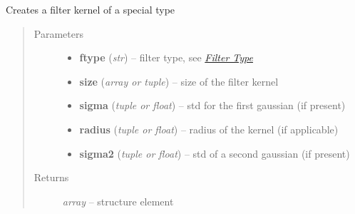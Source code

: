 \documentclass[letterpaper,10pt,english]{sphinxmanual}
\begin{document}
\begin{fulllineitems}
\label{api/ClearMap.ImageProcessing.Filter:ClearMap.ImageProcessing.Filter.FilterKernel.filterKernel}
Creates a filter kernel of a special type
\begin{quote}\begin{description}
\item[{Parameters}] \leavevmode\begin{itemize}
\item {} 
\textbf{ftype} (\emph{str}) --
filter type, see {\hyperref[api/ClearMap.ImageProcessing.Filter:filtertypes]{\emph{Filter Type}}}

\item {} 
\textbf{size} (\emph{array or tuple}) --
size of the filter kernel

\item {} 
\textbf{sigma} (\emph{tuple or float}) --
std for the first gaussian (if present)

\item {} 
\textbf{radius} (\emph{tuple or float}) --
radius of the kernel (if applicable)

\item {} 
\textbf{sigma2} (\emph{tuple or float}) --
std of a second gaussian (if present)

\end{itemize}

\item[{Returns}] \leavevmode
\emph{array} --
structure element

\end{description}\end{quote}

\end{fulllineitems}

\end{document}
